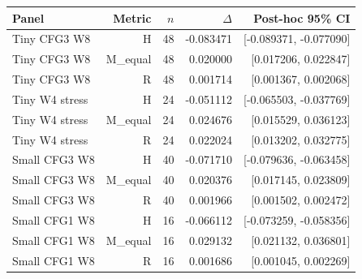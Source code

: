{\small\setlength{\tabcolsep}{3pt}
\begin{tabular}{lrrrr}
\hline
Panel & Metric & $n$ & $\Delta$ & Post-hoc 95\% CI \\
\hline
Tiny CFG3 W8 & H & 48 & -0.083471 & [-0.089371, -0.077090] \\
Tiny CFG3 W8 & M\_equal & 48 & 0.020000 & [0.017206, 0.022847] \\
Tiny CFG3 W8 & R & 48 & 0.001714 & [0.001367, 0.002068] \\
Tiny W4 stress & H & 24 & -0.051112 & [-0.065503, -0.037769] \\
Tiny W4 stress & M\_equal & 24 & 0.024676 & [0.015529, 0.036123] \\
Tiny W4 stress & R & 24 & 0.022024 & [0.013202, 0.032775] \\
Small CFG3 W8 & H & 40 & -0.071710 & [-0.079636, -0.063458] \\
Small CFG3 W8 & M\_equal & 40 & 0.020376 & [0.017145, 0.023809] \\
Small CFG3 W8 & R & 40 & 0.001966 & [0.001502, 0.002472] \\
Small CFG1 W8 & H & 16 & -0.066112 & [-0.073259, -0.058356] \\
Small CFG1 W8 & M\_equal & 16 & 0.029132 & [0.021132, 0.036801] \\
Small CFG1 W8 & R & 16 & 0.001686 & [0.001045, 0.002269] \\
\hline
\end{tabular}
}
